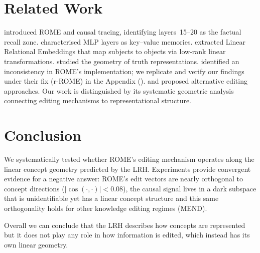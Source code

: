 \documentclass[11pt,a4paper]{article}
\newcommand{\abs}[1]{\lvert #1 \rvert}
\newcommand{\cosim}{\abs{\cos(\cdot,\cdot)}}
\begin{document}
\section{Related Work}
\label{sec:related}

\citet{meng2022locating} introduced ROME and causal tracing, identifying layers~15--20 as the factual recall zone.
\citet{geva2021transformer} characterised MLP layers as key--value memories.
\citet{hernandez2024linearity} extracted Linear Relational Embeddings that map subjects to objects via low-rank linear transformations.
\citet{marks2024geometry} studied the geometry of truth representations.
\citet{hase2024does} identified an inconsistency in ROME's implementation; we replicate and verify our findings under their fix (r-ROME) in the Appendix ().
\citet{decao2021editing} and \citet{mitchell2022fast} proposed alternative editing approaches.
Our work is distinguished by its systematic geometric analysis connecting editing mechanisms to representational structure.


\section{Conclusion}
\label{sec:conclusion}

We systematically tested whether ROME's editing mechanism operates along the linear concept geometry predicted by the LRH.
Experiments provide convergent evidence for a negative answer:
ROME's edit vectors are nearly orthogonal to concept directions ($\cosim < 0.08$),
the causal signal lives in a dark subspace that is unidentifiable yet has a linear concept structure and this same orthogonality holds for other knowledge editing regimes (MEND).



Overall we can conclude that the LRH describes how concepts are represented but it does not play any role in how information is edited, which instead has its own linear geometry.



\end{document}
